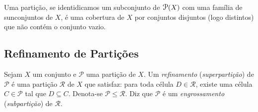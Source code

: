 Uma partição, se identidicamos um subconjunto de $\p(X)$ com uma família de sunconjuntos de $X$, é uma cobertura de $X$ por conjuntos disjuntos (logo distintos) que não contém o conjunto vazio.

\subsection{Refinamento de Partições}

\begin{defi}
Sejam $X$ um conjunto e $\mathcal P$ uma partição de $X$. Um \emph{refinamento} (\emph{superpartição}) de $\mathcal P$ é uma partição $\mathcal R$ de $X$ que satisfaz: para toda célula $D \in \mathcal R$, existe uma célula $C \in \mathcal P$ tal que $D \subseteq C$. Denota-se $\mathcal P \leq \mathcal R$. Diz que $\mathcal P$ é um \emph{engrossamento} (\emph{subpartição}) de $\mathcal R$.
\end{defi}

